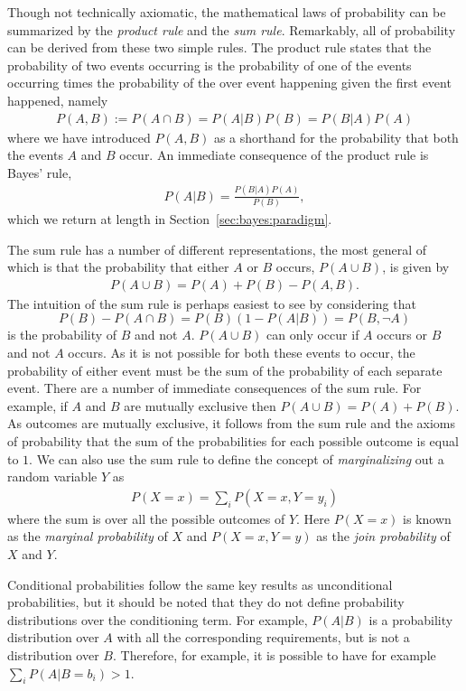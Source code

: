 Though not technically axiomatic, the mathematical laws of probability can be summarized by the \emph{product rule}
and the \emph{sum rule}.  Remarkably, all of probability can be derived from these two simple rules.
The product rule states that the probability of two events occurring is the probability of one of the events
occurring times the probability of the over event happening given the first event happened, namely
\begin{align}
\label{eq:prob:prod}
P(A,B) := P(A \cap B) = P(A|B) P(B) =  P(B|A) P(A)
\end{align}
where we have introduced $P(A,B)$ as a shorthand for the probability that both the events $A$ and $B$ occur.
An immediate consequence of the product rule is Bayes' rule,
\begin{align}
P(A|B) = \frac{P(B|A)P(A)}{P(B)},
\end{align}
which we return at length in Section~\ref{sec:bayes:paradigm}.

The sum rule has a number of different representations, the most general of which is that 
the probability that either $A$ or $B$ occurs, $P(A\cup B)$, is given by
\begin{align}
\label{eq:prob:sum}
P(A\cup B) = P(A) + P(B) - P(A, B).
\end{align}
The intuition of the sum rule is perhaps easiest to see by considering that
\[
P(B) - P(A \cap B) = P(B)(1-P(A|B)) = P(B, \neg A)
\]
 is the probability of $B$ and 
not $A$.  $P(A\cup B)$ can only occur if $A$ occurs or $B$ and not $A$ occurs.  As it is not
possible for both these events to occur, the probability of either event must be the sum of the
probability of each separate event.
There are a number of immediate consequences of the sum rule.  For example, if $A$ and $B$ are
mutually exclusive then $P(A\cup B) = P(A) + P(B)$.  As outcomes are mutually exclusive, it
follows from the sum rule and the axioms of probability that the sum of the probabilities
for each possible outcome is equal to $1$.  We can also use the sum rule to
define the concept of \emph{marginalizing} out a random variable $Y$ as
\begin{align}
\label{eq:prob:marginal}
P(X=x) = \sum_{i} P(X=x,Y=y_i)
\end{align}
where the sum is over all the possible outcomes of $Y$.  Here $P(X=x)$ is known as the
\emph{marginal probability} of $X$ and $P(X=x,Y=y)$ as the \emph{join probability} of $X$
and $Y$.

Conditional probabilities follow  the same key results as unconditional probabilities, but it 
should be noted that they do not define probability distributions over the conditioning term.  
For example, $P(A|B)$ is a probability distribution over $A$ with all the corresponding 
requirements, but is not a distribution over $B$.  Therefore,
for example, it is possible to have for example $\sum_{i} P(A|B=b_i) >1$.




